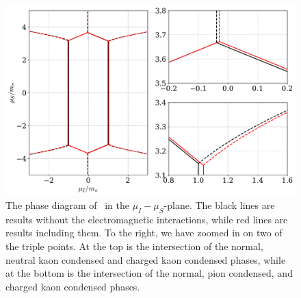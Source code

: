 \begin{figure}[!htb]
    \centering
    \includegraphics[width=.9\textwidth]{../scripts/figurer/phase_diagram_EM.pdf}
    \caption{
        The phase diagram of \chpt\ in the $\mu_I-\mu_S$-plane.
        The black lines are results without the electromagnetic interactions, while red lines are results including them. 
        To the right, we have zoomed in on two of the triple points.
        At the top is the intersection of the normal, neutral kaon condensed and charged kaon condensed phases, while at the bottom is the intersection of the normal, pion condensed, and charged kaon condensed phases.
        }
    \label{fig: phase diagram EM}
\end{figure}



